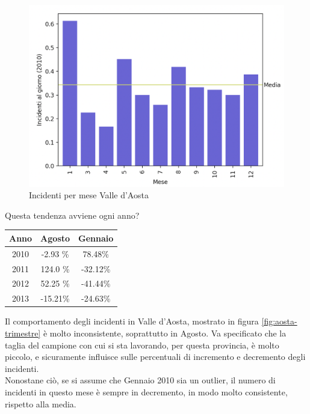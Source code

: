 \documentclass[a4paper]{report}
\begin{document}
\begin{figure}
    \includegraphics[width=\linewidth]{../src/incidenti/incidenti_senza_coords/mese_incidenti/aosta_mese.png}
    \caption{Incidenti per mese Valle d'Aosta}
    \label{fig:aosta}
\end{figure}

Questa tendenza avviene ogni anno?

\begin{center}
    \def\arraystretch{1.5}%
    \begin{tabular}{ |c|c|c| } 
    \hline
    Anno & Agosto & Gennaio \\ 
    \hline
    \rowcolor{TableGray}
    2010 & -2.93 \% & 78.48\%  \\ 
    2011 & 124.0 \% & -32.12\% \\
    \rowcolor{TableGray}
    2012 & 52.25 \% & -41.44\% \\
    2013 & -15.21\% & -24.63\% \\
    \hline
    \end{tabular}
\end{center}

Il comportamento degli incidenti in Valle d'Aosta, mostrato in figura \ref{fig:aosta-trimestre} 
è molto inconsistente, soprattutto in Agosto.
Va specificato che la taglia del campione con cui si sta lavorando, per questa provincia, 
è molto piccolo, e sicuramente influisce sulle percentuali di incremento e decremento 
degli incidenti.\\
Nonostane ciò, se si assume che Gennaio 2010 sia un outlier, il numero di incidenti in 
questo mese è sempre in decremento, in modo molto consistente, rispetto alla media.
\end{document}
